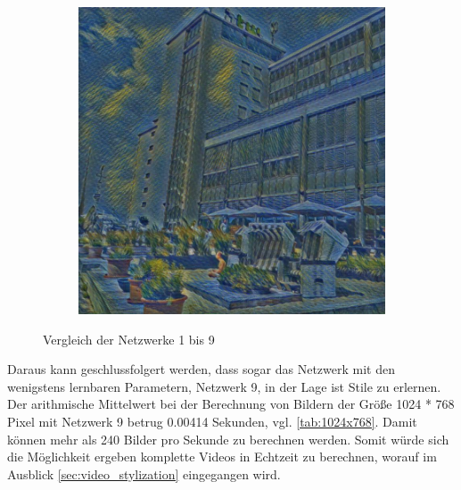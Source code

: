\begin{figure}[H]
\begin{subfigure}[h]{0.15\textwidth}
    \end{subfigure}
    \begin{subfigure}[h]{0.15\textwidth}
        \centering
        \includegraphics[width=\textwidth]{resources/content/experiments/net9.jpg}
    \end{subfigure}
    \caption{Vergleich der Netzwerke 1 bis 9}
\end{figure}

Daraus kann geschlussfolgert werden, dass sogar das Netzwerk mit den wenigstens lernbaren Parametern, Netzwerk 9, in der Lage ist Stile zu erlernen.
Der arithmische Mittelwert bei der Berechnung von Bildern der Größe 1024 * 768 Pixel mit Netzwerk 9 betrug 0.00414 Sekunden, vgl. \ref{tab:1024x768}. Damit können mehr als 240 Bilder pro Sekunde zu berechnen werden. Somit würde sich die Möglichkeit ergeben komplette Videos in Echtzeit zu berechnen, worauf im Ausblick \ref{sec:video_stylization} eingegangen wird.